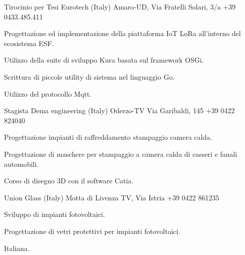\documentclass[italian,a4paper]{europasscv}
\begin{document}
\begin{europasscv}
	 {
		Tirocinio per Tesi
	}
	\ecvitem{} {
		Eurotech (Italy)  Amaro-UD,
		Via Fratelli Solari, 3/a \newline +39 0433.485.411
	}
	\ecvitem{} {
		\begin{ecvitemize}
				\item Progettazione ed implementazione
						della piattaforma IoT LoRa all'interno del ecosistema ESF.
				\item Utilizzo della suite di sviluppo Kura basata sul framework OSGi.
				\item Scrittura di piccole utility di sistema nel linguaggio Go.
				\item Utilizzo del protocollo Mqtt.
		\end{ecvitemize}
	}

	 {
		Stagista
	}
	\ecvitem{} {
		Dema engineering (Italy) Oderzo-TV Via Garibaldi, 145
		\newline +39 0422 824040
	}
	\ecvitem{} {
		\begin{ecvitemize}
			\item Progettazione impianti di raffreddamento stampaggio camera calda.
			\item Progettazione di maschere per stampaggio a camera calda di
				casseri e fanali automobili.
			\item Corso di disegno 3D con il software Catia.
		\end{ecvitemize}
	}

	\ecvitem{} {
		Union Glass (Italy) Motta di Livenza TV, Via Istria
		\newline +39 0422 861235
	}

	\ecvitem{} {
		\begin{ecvitemize}
			\item Sviluppo di impianti fotovoltaici.
			\item Progettazione di vetri protettivi per impianti fotovoltaici.
		\end{ecvitemize}
	}


	 {
		Italiana.
	}

	\ecvlanguageheader
	\ecvlanguagefooter


\end{europasscv}
\end{document}
